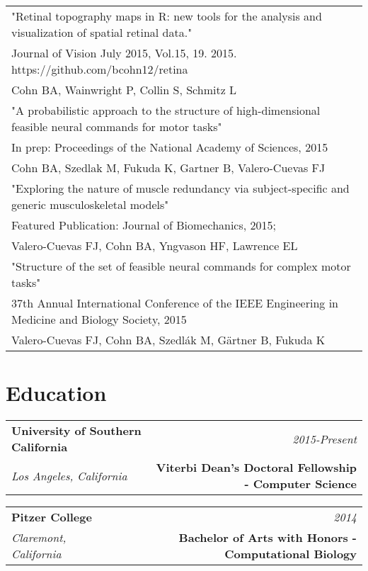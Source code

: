 \documentclass[10pt,a4paper]{article}
\begin{document}
  \vspace*{1mm}\begin{tabularx}{17cm}{X}
    "Retinal topography maps in R: new tools for the analysis and visualization of spatial retinal data." \\
    Journal of Vision July 2015, Vol.15, 19.  2015. https://github.com/bcohn12/retina \\
    Cohn BA, Wainwright P, Collin S, Schmitz L \\[2mm]

    "A probabilistic approach to the structure of high-dimensional feasible neural commands for motor tasks" \\
    In prep: Proceedings of the National Academy of Sciences, 2015 \\
    Cohn BA, Szedlak M, Fukuda K, Gartner B, Valero-Cuevas FJ \\[2mm]

    "Exploring the nature of muscle redundancy via subject-specific and generic musculoskeletal models" \\
    Featured Publication: Journal of Biomechanics, 2015; \\
    Valero-Cuevas FJ, Cohn BA, Yngvason HF, Lawrence EL \\[2mm]

    "Structure of the set of feasible neural commands for complex motor tasks" \\
    37th Annual International Conference of the IEEE Engineering in Medicine and Biology Society, 2015 \\
    Valero-Cuevas FJ, Cohn BA, Szedl\'{a}k M, G{\"a}rtner B, Fukuda K 
  \end{tabularx}

  \newpage

  \vspace*{-15mm}\section*{Education}

  \vspace*{0mm}\noindent\begin{tabularx}{17cm}{X r}
    \textbf{University of Southern California} & \textit{2015-Present} \\
    \textit{Los Angeles, California} & \textbf{Viterbi Dean's Doctoral Fellowship - Computer Science}
  \end{tabularx} 

  \vspace*{1mm}\noindent\begin{tabularx}{17cm}{X r}
    \textbf{Pitzer College} & \textit{2014} \\
    \textit{Claremont, California} & \textbf{Bachelor of Arts with Honors - Computational Biology}
  \end{tabularx}
\end{document}
